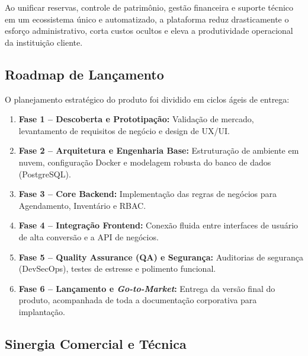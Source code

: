 \documentclass[12pt,a4paper]{article}
\begin{document}
	Ao unificar reservas, controle de patrimônio, gestão financeira e suporte técnico em um ecossistema único e automatizado, a plataforma reduz drasticamente o esforço administrativo, corta custos ocultos e eleva a produtividade operacional da instituição cliente.
	
	
	\subsection{Roadmap de Lançamento}
	
	O planejamento estratégico do produto foi dividido em ciclos ágeis de entrega:
	
	\begin{enumerate}
		
		\item \textbf{Fase 1 -- Descoberta e Prototipação:} Validação de mercado, levantamento de requisitos de negócio e design de UX/UI.
		
		\item \textbf{Fase 2 -- Arquitetura e Engenharia Base:} Estruturação de ambiente em nuvem, configuração Docker e modelagem robusta do banco de dados (PostgreSQL).
		
		\item \textbf{Fase 3 -- Core Backend:} Implementação das regras de negócios para Agendamento, Inventário e RBAC.
		
		\item \textbf{Fase 4 -- Integração Frontend:} Conexão fluida entre interfaces de usuário de alta conversão e a API de negócios.
		
		\item \textbf{Fase 5 -- Quality Assurance (QA) e Segurança:} Auditorias de segurança (DevSecOps), testes de estresse e polimento funcional.
		
		\item \textbf{Fase 6 -- Lançamento e \textit{Go-to-Market}:} Entrega da versão final do produto, acompanhada de toda a documentação corporativa para implantação.
		
	\end{enumerate}
	
	
	\subsection{Sinergia Comercial e Técnica}
	
\end{document}
